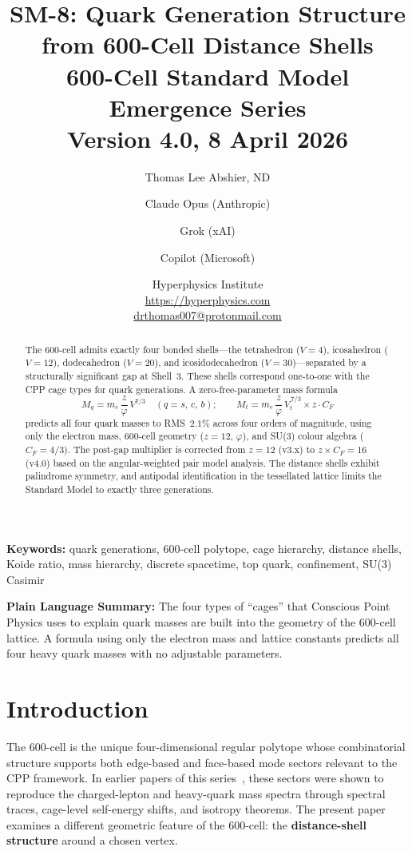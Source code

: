 \documentclass[11pt,letterpaper]{article}
\title{\textbf{SM-8: Quark Generation Structure\\from 600-Cell Distance Shells}\\[6pt]
{\large 600-Cell Standard Model Emergence Series}\\[4pt]
{\normalsize Version 4.0, 8 April 2026}}
\author{Thomas Lee Abshier, ND \and Claude Opus (Anthropic)
\and Grok (xAI) \and Copilot (Microsoft)}
\date{\normalsize Hyperphysics Institute\\
\url{https://hyperphysics.com}\\
\href{mailto:drthomas007@protonmail.com}{drthomas007@protonmail.com}}
\newcommand{\phig}{\varphi}
\begin{document}
\maketitle

\begin{abstract}
The 600-cell admits exactly four bonded shells---the tetrahedron
($V\!=\!4$), icosahedron ($V\!=\!12$), dodecahedron ($V\!=\!20$),
and icosidodecahedron ($V\!=\!30$)---separated by a structurally
significant gap at Shell~3.  These shells correspond one-to-one with
the CPP cage types for quark generations.  A zero-free-parameter
mass formula
\[
  M_q = m_e \,\frac{z}{\phig}\, V^{7/3}
  \quad (q = s,\,c,\,b); \qquad
  M_t = m_e \,\frac{z}{\phig}\, V_t^{\,7/3} \times z \cdot C_F
\]
predicts all four quark masses to RMS~$2.1\%$ across four orders of
magnitude, using only the electron mass, 600-cell geometry
($z\!=\!12$, $\phig$), and SU(3) colour algebra ($C_F\!=\!4/3$).
The post-gap multiplier is corrected from $z\!=\!12$ (v3.x) to
$z \times C_F\!=\!16$ (v4.0) based on the angular-weighted pair
model analysis.  The distance shells exhibit palindrome symmetry,
and antipodal identification in the tessellated lattice limits the
Standard Model to exactly three generations.
\end{abstract}

\medskip\noindent
\textbf{Keywords:} quark generations, 600-cell polytope, cage hierarchy,
distance shells, Koide ratio, mass hierarchy, discrete spacetime,
top quark, confinement, SU(3) Casimir

\bigskip\noindent
\textbf{Plain Language Summary:}
The four types of ``cages'' that Conscious Point Physics uses to explain
quark masses are built into the geometry of the 600-cell lattice.
A formula using only the electron mass and lattice constants
predicts all four heavy quark masses with no adjustable parameters.

\bigskip
\tableofcontents
\newpage

\section{Introduction}

The 600-cell is the unique four-dimensional regular polytope whose
combinatorial structure supports both edge-based and face-based mode
sectors relevant to the CPP framework.  In earlier papers of this
series~\citep{abshier2026sm6,abshier2026sm7}, these sectors were
shown to reproduce the charged-lepton and heavy-quark mass spectra
through spectral traces, cage-level self-energy shifts, and isotropy
theorems.  The present paper examines a different geometric feature
of the 600-cell: the \textbf{distance-shell structure} around a
chosen vertex.
\end{document}
